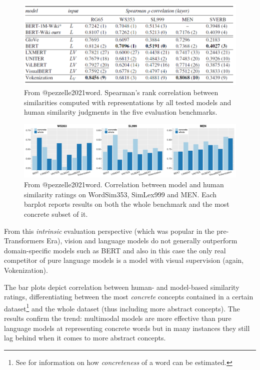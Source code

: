 \documentclass[
]{krantz}
\begin{document}
\begin{figure}

{\centering \includegraphics[width=1\linewidth]{figures/02-03-img-support-text/img-pezzele2021-01} 

}

\caption{From @pezzelle2021word. Spearman’s rank correlation between similarities computed with representations by all tested models and human similarity judgments in the five evaluation benchmarks.}\label{fig:img-pezzele2021-01}
\end{figure}

\begin{figure}

{\centering \includegraphics[width=1\linewidth]{figures/02-03-img-support-text/img-pezzele2021-02} 

}

\caption{From @pezzelle2021word. Correlation between model and human similarity ratings on WordSim353, SimLex999 and MEN. Each barplot reports results on both the whole benchmark and the most concrete subset of it.}\label{fig:img-pezzele2021-02}
\end{figure}

From this \emph{intrinsic} evaluation perspective (which was popular in the pre-Transformers Era), vision and language models do not generally outperform domain-specific models such as BERT and also in this case the only real competitor of pure language models is a model with visual supervision (again, Vokenization).

The bar plots depict correlation between human- and model-based similarity ratings, differentiating between the most \emph{concrete} concepts contained in a certain dataset\footnote{See \citet{brysbaert2014concreteness} for information on how \emph{concreteness} of a word can be estimated.} and the whole dataset (thus including more abstract concepts). The results confirm the trend: multimodal models are more effective than pure language models at representing concrete words but in many instances they still lag behind when it comes to more abstract concepts.
\end{document}

